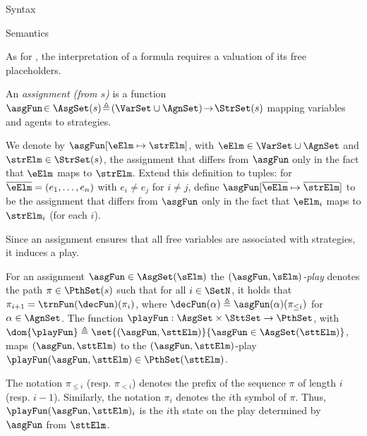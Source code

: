 \begin{subsection}{Syntax}
	\end{subsection}
	

	\begin{subsection}{Semantics}

		As for \SL, the interpretation of a \GSLT formula requires a
		valuation of its free placeholders.
		
		\begin{definition}
		An \emph{assignment (from $s$)} is a function $\asgFun \! \in
		\AsgSet(s) \!\defeq \!(\VarSet \cup \AgnSet) \!\to\! \StrSet(s)$ mapping
		variables and agents to strategies.
%
		\end{definition}
				We denote by ${\asgFun}[\eElm \mapsto \strElm]$, with $\eElm \in \VarSet
				\cup \AgnSet$ and $\strElm \in \StrSet(s)$, the assignment
				that differs from $\asgFun$ only in the fact that $\eElm$ maps to $\strElm$.
		Extend this definition to tuples: for $\overline{\eElm} = (e_1, \dots,
		e_n)$ with $e_i \neq e_j$ for $i \neq j$, define
		${\asgFun}[\overline{\eElm} \mapsto \overline{\strElm}]$ to be
		the assignment that differs from $\asgFun$ only in the fact that $\eElm_i$
		maps to $\strElm_i$ (for each $i$).

		Since an assignment ensures that all free variables are associated with strategies, it induces a play.
		\begin{definition}
		For an assignment $\asgFun \in \AsgSet(\sElm)$ the \emph{$(\asgFun, \sElm)$-play}
		denotes the path $\pi \in \PthSet(s)$ such that for all $i \in \SetN$, it holds that $\pi_{i + 1} =
		\trnFun(\decFun)(\pi_{i})$, where $\decFun(\alpha) \defeq
		\asgFun(\alpha)(\pi_{\leq i})$ for $\alpha \in
		\AgnSet$. 				The function $\playFun : \AsgSet \times \SttSet \to \PthSet$, with
				$\dom{\playFun} \defeq \set{ (\asgFun, \sttElm) }{ \asgFun \in \AsgSet(\sttElm)
				}$, maps  $(\asgFun, \sttElm)$ to the $(\asgFun,
				\sttElm)$-play $\playFun(\asgFun, \sttElm) \allowbreak \in
				\PthSet(\sttElm)$.
		\end{definition}


		The notation $\pi_{\leq i}$ (resp. $\pi_{< i}$) denotes the prefix of the sequence $\pi$ of length $i$ (resp. $i-1$). Similarly, the notation
		$\pi_i$ denotes the $i$th symbol of $\pi$. Thus, 
$\playFun(\asgFun,\sttElm)_i$ is the $i$th state on the play determined by 
$\asgFun$ from $\sttElm$.


\end{subsection}
